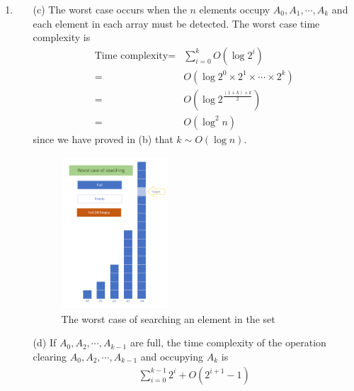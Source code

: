 \documentclass[12pt,a4paper]{article}
\makeatletter
\newtheorem*{solution}{Solution}
\theoremstyle{definition}
\renewenvironment{solution}[1][Solution] {\par\pushQED{\qed}\normalfont\topsep6\p@\@plus6\p@\relax\trivlist\item[\hskip\labelsep\bfseries#1\@addpunct{.}]\ignorespaces}{\popQED\endtrivlist\@endpefalse} \makeatother
\makeatother
\begin{document}
\begin{enumerate}
\begin{enumerate}
\begin{solution}
\begin{enumerate}
\begin{proof}
\begin{proof} [Proof of Lemma.~\ref{lemma2}]
        Let $q\leftarrow q+1$:
        $$a_{p,q+1}=\sum_{i=p}^{q}a_{p,i}$$
        By subtraction of the two formula we have:
        $$a_{p,q+1}=2a_{p,q}=\cdots=2^{(q+1)-1-p}a_{p,p+1}=2^{(q+1)-1-p}$$
        
        \end{proof}        
        \end{proof}
    \item [(c)]
    The worst case occurs when the $n$ elements occupy $A_0,A_1,\cdots,A_k$ and each element in each array must be detected. The worst case time complexity is 
    \begin{equation}
        \begin{split}
        \text{Time complexity} = &\sum_{i=0}^k O(\log 2^i)\\
            =& O(\log 2^0\times 2^1\times \cdots \times 2^k)\\
            =& O(\log 2^{\frac{(1+k)\times k}{2}})\\
            =& O(\log^2 n)
        \end{split}
    \end{equation}
    since we have proved in (b) that $k\sim O(\log n)$.
    \begin{figure}[htbp]
        	\centering
        	\includegraphics[width=0.4\textwidth]{WorstSearching.pdf}
        	\caption{The worst case of searching an element in the set}
        	\label{WorstSearching}
    	\end{figure}  
    \item[(d)] If $A_0,A_2,\cdots,A_{k-1}$ are full, the time complexity of the operation clearing $A_0,A_2,\cdots,A_{k-1}$ and occupying $A_k$ is
    \begin{equation}\label{Equ-1}
        \begin{split}
            \sum_{i=0}^{k-1} 2^i+O(2^{i+1}-1)

\end{split}
\end{equation}
\end{enumerate}
\end{solution}
\end{enumerate}
\end{enumerate}
\end{document}
